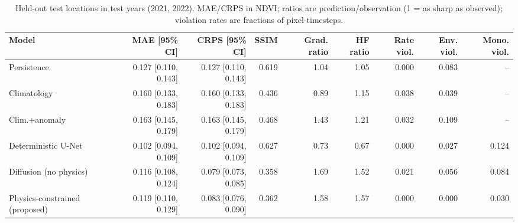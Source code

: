 \begin{table}[t]
\centering
\caption{Held-out test locations in test years (2021, 2022). MAE/CRPS in NDVI; ratios are prediction/observation (1 = as sharp as observed); violation rates are fractions of pixel-timesteps.}
\label{tab:main}
\scriptsize
\begin{tabular}{lrrrrrrrr}
\hline
Model & MAE [95\% CI] & CRPS [95\% CI] & SSIM & Grad. ratio & HF ratio & Rate viol. & Env. viol. & Mono. viol. \\
\hline
Persistence & 0.127 [0.110, 0.143] & 0.127 [0.110, 0.143] & 0.619 & 1.04 & 1.05 & 0.000 & 0.083 & -- \\
Climatology & 0.160 [0.133, 0.183] & 0.160 [0.133, 0.183] & 0.436 & 0.89 & 1.15 & 0.038 & 0.039 & -- \\
Clim.+anomaly & 0.163 [0.145, 0.179] & 0.163 [0.145, 0.179] & 0.468 & 1.43 & 1.21 & 0.032 & 0.109 & -- \\
Deterministic U-Net & 0.102 [0.094, 0.109] & 0.102 [0.094, 0.109] & 0.627 & 0.73 & 0.67 & 0.000 & 0.027 & 0.124 \\
Diffusion (no physics) & 0.116 [0.108, 0.124] & 0.079 [0.073, 0.085] & 0.358 & 1.69 & 1.52 & 0.021 & 0.056 & 0.084 \\
Physics-constrained (proposed) & 0.119 [0.110, 0.129] & 0.083 [0.076, 0.090] & 0.362 & 1.58 & 1.57 & 0.000 & 0.000 & 0.030 \\
\hline
\end{tabular}
\end{table}
